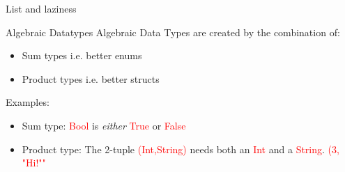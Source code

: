 \documentclass[pdf]{beamer}
\newcommand{\code}[1]{\textcolor{Red}{\textsf{#1}}}
\begin{document}
\begin{frame}{List and laziness}
  \begin{figure}[H]
    \centering
    \vspace{0.2cm}
  \end{figure}
\end{frame}

\begin{frame}{Algebraic Datatypes}
  Algebraic Data Types are created by the combination of:
  \begin{itemize}
  \item Sum types i.e. better enums
  \item Product types i.e. better structs
  \end{itemize}

  Examples:
  \begin{itemize}
  \item Sum type: \code{Bool} is \textit{either} \code{True} or \code{False}
  \item Product type: The 2-tuple \code{(Int,String)} needs both an \code{Int} and a \code{String}. \code{(3, "Hi!""}
  \end{itemize}
\end{frame}
\end{document}
